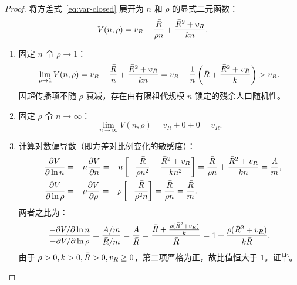\begin{proof}
将方差式~\eqref{eq:var-closed} 展开为 $n$ 和 $\rho$ 的显式二元函数：
\begin{equation}
  V(n, \rho) = v_R + \frac{\bar{R}}{\rho n} + \frac{\bar{R}^2 + v_R}{kn}.
\end{equation}
\begin{enumerate}
  \item 固定 $n$ 令 $\rho \to 1$：
  \begin{equation}
    \lim_{\rho \to 1} V(n, \rho) = v_R + \frac{\bar{R}}{n} + \frac{\bar{R}^2 + v_R}{kn} = v_R + \frac{1}{n}\left(\bar{R} + \frac{\bar{R}^2+v_R}{k}\right) > v_R.
  \end{equation}
  因超传播项不随 $\rho$ 衰减，存在由有限祖代规模 $n$ 锁定的残余人口随机性。
  \item 固定 $\rho$ 令 $n \to \infty$：
  \begin{equation}
    \lim_{n \to \infty} V(n, \rho) = v_R + 0 + 0 = v_R.
  \end{equation}
  \item 计算对数偏导数（即方差对比例变化的敏感度）：
  \begin{align}
    -\frac{\partial V}{\partial \ln n} &= -n \frac{\partial V}{\partial n} = -n \left[ -\frac{\bar{R}}{\rho n^2} - \frac{\bar{R}^2 + v_R}{kn^2} \right] = \frac{\bar{R}}{\rho n} + \frac{\bar{R}^2 + v_R}{kn} = \frac{A}{m}, \\
    -\frac{\partial V}{\partial \ln \rho} &= -\rho \frac{\partial V}{\partial \rho} = -\rho \left[ -\frac{\bar{R}}{\rho^2 n} \right] = \frac{\bar{R}}{\rho n} = \frac{\bar{R}}{m}.
  \end{align}
  两者之比为：
  \begin{equation}
    \frac{-\partial V / \partial \ln n}{-\partial V / \partial \ln \rho} = \frac{A/m}{\bar{R}/m} = \frac{A}{\bar{R}} = \frac{\bar{R} + \frac{\rho(\bar{R}^2+v_R)}{k}}{\bar{R}} = 1 + \frac{\rho(\bar{R}^2 + v_R)}{k\bar{R}}.
  \end{equation}
  由于 $\rho > 0, k > 0, \bar{R} > 0, v_R \ge 0$，第二项严格为正，故比值恒大于 1。证毕。
\end{enumerate}
\end{proof}
